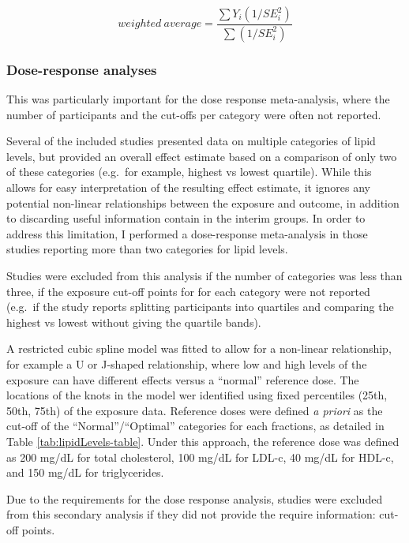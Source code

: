 \documentclass[a4paper, twoside]{templates/ociamthesis}
\begin{document}
\begin{equation}
  weighted\ average = \frac{\sum Y_i (1/SE_i^2)}{\sum(1/SE_i^2)}
  \label{eq:meta-analysis-fixed}
\end{equation}

\hypertarget{dose-response-analyses}{%
\subsubsection{Dose-response analyses}\label{dose-response-analyses}}

This was particularly important for the dose response meta-analysis, where the number of participants and the cut-offs per category were often not reported.

Several of the included studies presented data on multiple categories of lipid levels, but provided an overall effect estimate based on a comparison of only two of these categories (e.g.~for example, highest vs lowest quartile). While this allows for easy interpretation of the resulting effect estimate, it ignores any potential non-linear relationships between the exposure and outcome, in addition to discarding useful information contain in the interim groups. In order to address this limitation, I performed a dose-response meta-analysis in those studies reporting more than two categories for lipid levels.

Studies were excluded from this analysis if the number of categories was less than three, if the exposure cut-off points for for each category were not reported (e.g.~if the study reports splitting participants into quartiles and comparing the highest vs lowest without giving the quartile bands).

A restricted cubic spline model was fitted to allow for a non-linear relationship, for example a U or J-shaped relationship, where low and high levels of the exposure can have different effects versus a ``normal'' reference dose. The locations of the knots in the model wer identified using fixed percentiles (25th, 50th, 75th) of the exposure data. Reference doses were defined \emph{a priori} as the cut-off of the ``Normal''/``Optimal'' categories for each fractions, as detailed in Table \ref{tab:lipidLevels-table}. Under this approach, the reference dose was defined as 200 mg/dL for total cholesterol, 100 mg/dL for LDL-c, 40 mg/dL for HDL-c, and 150 mg/dL for triglycerides.

Due to the requirements for the dose response analysis, studies were excluded from this secondary analysis if they did not provide the require information: cut-off points.
\end{document}
